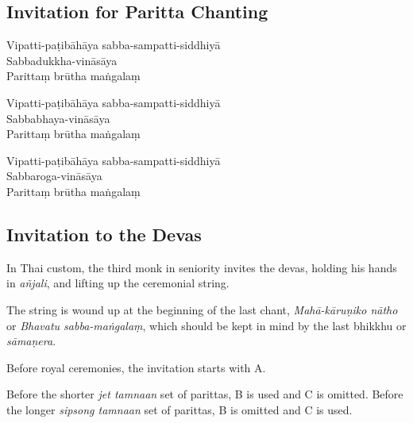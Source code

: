 \subsection{Invitation for Paritta Chanting}
\label{paritta-invitation-for-chanting}


\vspace*{5pt}

\begin{paritta}


Vipatti-paṭibāhāya sabba-sampatti-siddhiyā\\
Sabbadukkha-vināsāya\\
Parittaṃ brūtha maṅgalaṃ

Vipatti-paṭibāhāya sabba-sampatti-siddhiyā\\
Sabbabhaya-vināsāya\\
Parittaṃ brūtha maṅgalaṃ

Vipatti-paṭibāhāya sabba-sampatti-siddhiyā\\
Sabbaroga-vināsāya\\
Parittaṃ brūtha maṅgalaṃ

\end{paritta}

\subsection{Invitation to the Devas}
\label{paritta-devas}


\enlargethispage{\baselineskip}

In Thai custom, the third monk in seniority invites the devas, holding his
hands in \emph{añjali}, and lifting up the ceremonial string.

The string is wound up at the beginning of the last chant, \emph{Mahā-kāruṇiko
  nātho} or \emph{Bhavatu sabba-maṅgalaṃ}, which should be kept in mind by the
last bhikkhu or \emph{sāmaṇera}.

Before royal ceremonies, the invitation starts with A.

Before the shorter \emph{jet tamnaan} set of parittas, B is used and C is
omitted. Before the longer \emph{sipsong tamnaan} set of parittas, B is
omitted and C is used.


